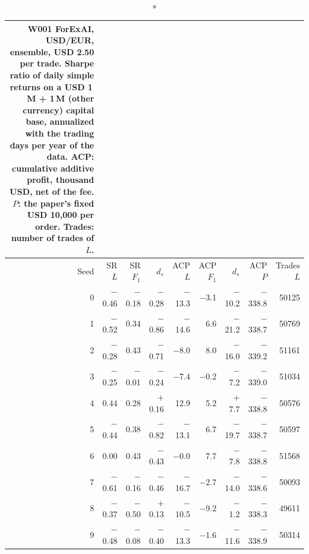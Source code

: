 \begin{longtable}{@{}rrrrrrrrr@{}}
\caption*{\small W001 ForExAI, USD/EUR, ensemble, USD 2.50 per trade. Sharpe ratio of daily simple returns on a USD 1\,M + 1\,M (other currency) capital base, annualized with the trading days per year of the data. ACP: cumulative additive profit, thousand USD, net of the fee. $P$: the paper's fixed USD 10,000 per order. Trades: number of trades of $L$.}\\
\toprule
Seed & SR $L$ & SR $F_1$ & $d_s$ & ACP $L$ & ACP $F_1$ & $d_s$ & ACP $P$ & Trades $L$\\ \midrule\endhead
0 & $-$0.46 & $-$0.18 & $-$0.28 & $-$13.3 & $-$3.1 & $-$10.2 & $-$338.8 & 50125\\
1 & $-$0.52 & 0.34 & $-$0.86 & $-$14.6 & 6.6 & $-$21.2 & $-$338.7 & 50769\\
2 & $-$0.28 & 0.43 & $-$0.71 & $-$8.0 & 8.0 & $-$16.0 & $-$339.2 & 51161\\
3 & $-$0.25 & $-$0.01 & $-$0.24 & $-$7.4 & $-$0.2 & $-$7.2 & $-$339.0 & 51034\\
4 & 0.44 & 0.28 & $+$0.16 & 12.9 & 5.2 & $+$7.7 & $-$338.8 & 50576\\
5 & $-$0.44 & 0.38 & $-$0.82 & $-$13.1 & 6.7 & $-$19.7 & $-$338.7 & 50597\\
6 & 0.00 & 0.43 & $-$0.43 & $-$0.0 & 7.7 & $-$7.8 & $-$338.8 & 51568\\
7 & $-$0.61 & $-$0.16 & $-$0.46 & $-$16.7 & $-$2.7 & $-$14.0 & $-$338.6 & 50093\\
8 & $-$0.37 & $-$0.50 & $+$0.13 & $-$10.5 & $-$9.2 & $-$1.2 & $-$338.3 & 49611\\
9 & $-$0.48 & $-$0.08 & $-$0.40 & $-$13.3 & $-$1.6 & $-$11.6 & $-$338.9 & 50314\\
\bottomrule\end{longtable}
